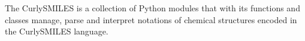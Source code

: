The CurlySMILES is a collection of Python modules that with its functions and classes manage, parse and interpret notations of chemical structures encoded in the CurlySMILES language.